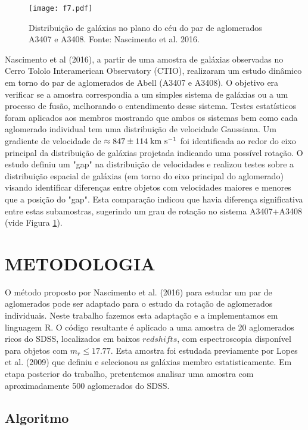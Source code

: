 \documentclass[12pt,fleqn]{article}
\begin{document}
{\begin{figure}[!htbp] %
\vspace{-2pt}
\begin{center}
\texttt{[image: f7.pdf]}%
\caption{Distribuição de galáxias no plano do céu do par de aglomerados A3407 e A3408. Fonte: Nascimento et al. 2016.}
\label{fig3}%
\end{center}
\end{figure}

Nascimento et al (2016), a partir de uma amostra de galáxias observadas no Cerro Tololo Interamerican Observatory (CTIO), realizaram um estudo dinâmico em torno do par de aglomerados de Abell (A3407 e A3408). O objetivo era verificar se a amostra correspondia a um simples sistema de galáxias ou a um processo de fusão, melhorando o entendimento desse sistema. Testes estatísticos foram aplicados aos membros mostrando que ambos os sistemas bem como cada aglomerado individual tem uma distribuição de velocidade Gaussiana. Um gradiente de velocidade de $\approx 847 \pm 114\; {\rm km~s^{-1}}$ foi identificada ao redor do eixo principal da distribuição de galáxias projetada indicando uma possível rotação. 
O estudo definiu um "gap" na distribuição de velocidades e realizou testes sobre a distribuição
espacial de galáxias (em torno do eixo principal do aglomerado) visando identificar diferenças
entre objetos com velocidades maiores e menores que a posição do "gap". Esta comparação
indicou que havia diferença significativa entre estas subamostras, sugerindo um grau de
rotação no sistema A3407+A3408 (vide Figura \ref{fig3}).

\section{METODOLOGIA}

O método proposto por Nascimento et al. (2016) para estudar um par de aglomerados
pode ser adaptado para o estudo da rotação de aglomerados individuais. Neste trabalho
fazemos esta adaptação e a implementamos em linguagem R. O código resultante
é aplicado a uma amostra
de 20 aglomerados ricos do SDSS, localizados em baixos $redshifts$, com espectroscopia
disponível para objetos com $m_r \leq 17.77$. Esta amostra foi estudada previamente
por Lopes et al. (2009) que definiu e selecionou as galáxias membro estatisticamente.
Em etapa posterior do trabalho, pretentemos analisar uma amostra com aproximadamente 500 
aglomerados do SDSS.

\subsection{Algoritmo}

}
\end{document}

